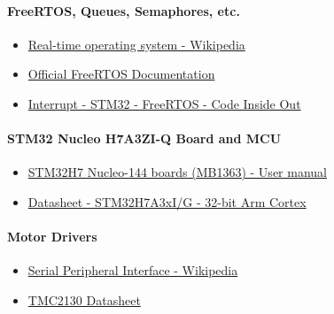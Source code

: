 \paragraph{FreeRTOS, Queues, Semaphores, etc.}

\begin{itemize}
    
    \item \href{https://en.wikipedia.org/wiki/Real-time_operating_system}{Real-time operating system - Wikipedia}
    
    \item \href{https://www.freertos.org/features.html}{Official FreeRTOS Documentation}
    
    \item \href{https://www.codeinsideout.com/blog/stm32/free-rtos/interrupt/}{Interrupt - STM32 - FreeRTOS - Code Inside Out}

\end{itemize}



\paragraph{STM32 Nucleo H7A3ZI-Q Board and MCU}

\begin{itemize}


    \item \href{https://www.st.com/resource/en/user_manual/dm00499171-stm32h7-nucleo144-boards-mb1363-stmicroelectronics.pdf}{STM32H7 Nucleo-144 boards (MB1363) - User manual}
    
    \item \href{https://www.st.com/resource/en/datasheet/stm32h7a3ai.pdf}{Datasheet - STM32H7A3xI/G - 32-bit Arm Cortex}
    
\end{itemize}


\paragraph{Motor Drivers}

\begin{itemize}

    \item \href{https://en.wikipedia.org/wiki/Serial_Peripheral_Interface}{Serial Peripheral Interface - Wikipedia}

    \item \href{https://www.trinamic.com/fileadmin/assets/Products/ICs_Documents/TMC2130_datasheet.pdf}{TMC2130 Datasheet}

\end{itemize} 



